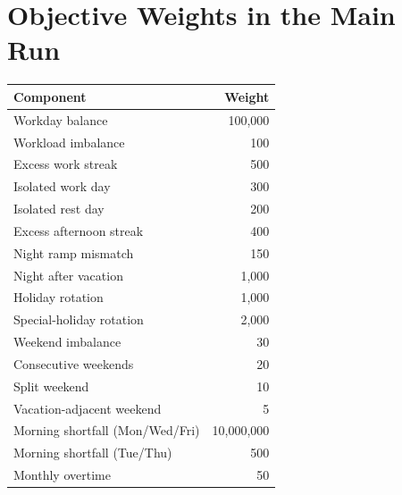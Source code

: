 \documentclass[11pt,a4paper]{article}
\begin{document}
\section{Objective Weights in the Main Run}

\begin{longtable}{lr}
\toprule
Component & Weight \\
\midrule
\endhead
Workday balance & 100,000 \\
Workload imbalance & 100 \\
Excess work streak & 500 \\
Isolated work day & 300 \\
Isolated rest day & 200 \\
Excess afternoon streak & 400 \\
Night ramp mismatch & 150 \\
Night after vacation & 1,000 \\
Holiday rotation & 1,000 \\
Special-holiday rotation & 2,000 \\
Weekend imbalance & 30 \\
Consecutive weekends & 20 \\
Split weekend & 10 \\
Vacation-adjacent weekend & 5 \\
Morning shortfall (Mon/Wed/Fri) & 10,000,000 \\
Morning shortfall (Tue/Thu) & 500 \\
Monthly overtime & 50 \\
\bottomrule
\end{longtable}
\end{document}
